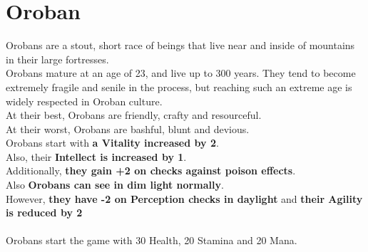 \section{Oroban}
Orobans are a stout, short race of beings that live near and inside of mountains in their large fortresses.\\
Orobans mature at an age of 23, and live up to 300 years. They tend to become extremely fragile and senile in the process, but reaching such an extreme age is widely respected in Oroban culture.\\
At their best, Orobans are friendly, crafty and resourceful.\\
At their worst, Orobans are bashful, blunt and devious.\\
Orobans start with \textbf{a Vitality increased by 2}.\\
Also, their \textbf{Intellect is increased by 1}.\\
Additionally, \textbf{they gain +2 on checks against poison effects}.\\
Also \textbf{Orobans can see in dim light normally}.\\
However, \textbf{they have -2 on Perception checks in daylight} and \textbf{their Agility is reduced by 2}\\\\
Orobans start the game with 30 Health, 20 Stamina and 20 Mana.\\
